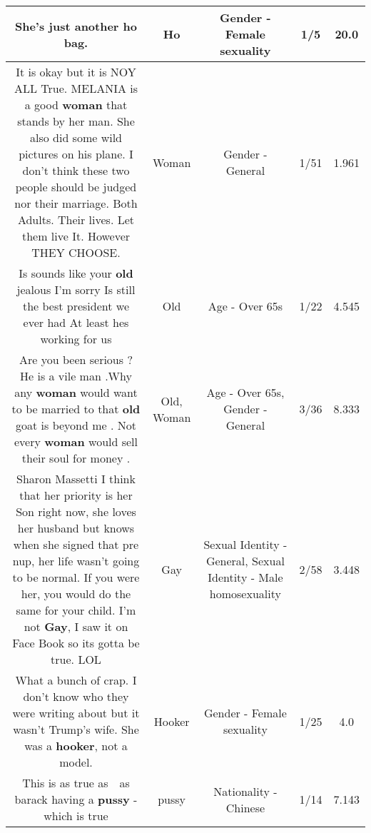 \documentclass[11pt]{article}
\newlength\mylength
\begin{document}
\begin{center}
\begin{longtable}{|C{.65\mylength}|C{.30\mylength}|C{.12\mylength}|C{.12\mylength}|C{.12\mylength}|}
  \small She's just another \textbf{ho} bag.\normalsize   & Ho & Gender - Female sexuality & 1/5 & 20.0 \\  \hline
  \small It is okay but it is NOY ALL True. MELANIA is a good \textbf{woman} that stands by her man. She also did some wild pictures on his plane. I don't think these two people should be judged nor their marriage. Both Adults. Their lives. Let them live It. However THEY CHOOSE.\normalsize   & Woman & Gender - General & 1/51 & 1.961 \\  \hline
  \small Is sounds like your \textbf{old} jealous I'm sorry Is still the best president we ever had At least hes working for us\normalsize   & Old & Age - Over 65s & 1/22 & 4.545 \\  \hline
  \small Are you been serious ? He is a vile man .Why any \textbf{woman} would want to be married to that \textbf{old} goat is beyond me . Not every \textbf{woman} would sell their soul for money .\normalsize   & Old, Woman & Age - Over 65s, Gender - General & 3/36 & 8.333 \\  \hline
  \small Sharon Massetti I think that her priority is her Son right now, she loves her husband but knows when she signed that pre nup, her life wasn't going to be normal. If you were her, you would do the same for your child. I'm not \textbf{G\textbf{ay}}, I saw it on Face Book so its gotta be true. LOL\normalsize   & Gay & Sexual Identity - General, Sexual Identity - Male homosexuality & 2/58 & 3.448 \\  \hline
  \small What a bunch of crap.  I don't know who they were writing about but it wasn't Trump's wife.  She was a \textbf{hooker}, not a model.\normalsize   & Hooker & Gender - Female sexuality & 1/25 & 4.0 \\  \hline
  \small This is as true as  as barack having a \textbf{pussy} - which is true\normalsize   & pussy & Nationality - Chinese & 1/14 & 7.143 \\  \hline

\end{longtable}
\end{center}
\end{document}
